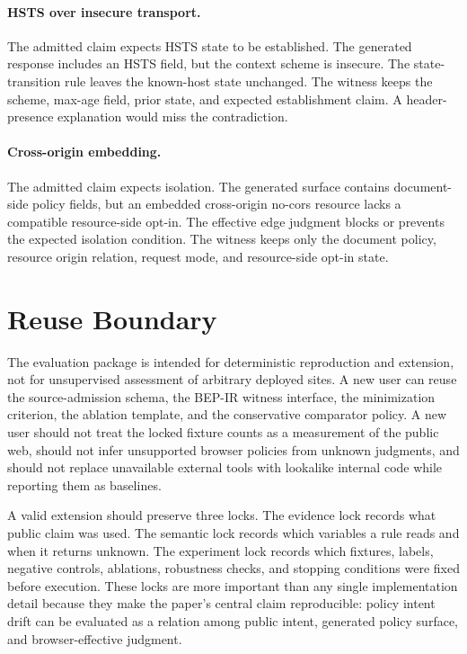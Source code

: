 \documentclass[10pt,conference]{IEEEtran}
\begin{document}
\paragraph{HSTS over insecure transport.}
The admitted claim expects HSTS state to be established. The generated response includes an HSTS field, but the context scheme is insecure. The state-transition rule leaves the known-host state unchanged. The witness keeps the scheme, max-age field, prior state, and expected establishment claim. A header-presence explanation would miss the contradiction.

\paragraph{Cross-origin embedding.}
The admitted claim expects isolation. The generated surface contains document-side policy fields, but an embedded cross-origin no-cors resource lacks a compatible resource-side opt-in. The effective edge judgment blocks or prevents the expected isolation condition. The witness keeps only the document policy, resource origin relation, request mode, and resource-side opt-in state.

\section{Reuse Boundary}

The evaluation package is intended for deterministic reproduction and extension, not for unsupervised assessment of arbitrary deployed sites. A new user can reuse the source-admission schema, the BEP-IR witness interface, the minimization criterion, the ablation template, and the conservative comparator policy. A new user should not treat the locked fixture counts as a measurement of the public web, should not infer unsupported browser policies from unknown judgments, and should not replace unavailable external tools with lookalike internal code while reporting them as baselines.

A valid extension should preserve three locks. The evidence lock records what public claim was used. The semantic lock records which variables a rule reads and when it returns unknown. The experiment lock records which fixtures, labels, negative controls, ablations, robustness checks, and stopping conditions were fixed before execution. These locks are more important than any single implementation detail because they make the paper's central claim reproducible: policy intent drift can be evaluated as a relation among public intent, generated policy surface, and browser-effective judgment.
\end{document}
